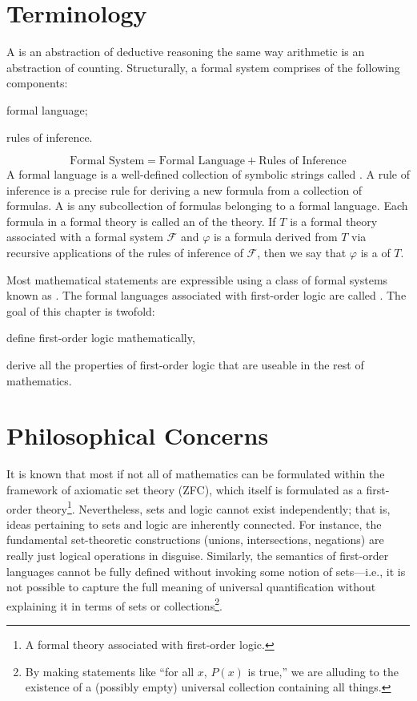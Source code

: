 \section{Terminology}
A  is an abstraction of deductive reasoning the same way arithmetic is an abstraction of counting.
Structurally, a formal system comprises of the following components:
\begin{enumerate*}[label=(\arabic*)]
    \item formal language;
    \item rules of inference.
\end{enumerate*}
\begin{equation*}
    \text{Formal System} = \text{Formal Language} + \text{Rules of Inference}
\end{equation*}
A formal language is a well-defined collection of symbolic strings called .
A rule of inference is a precise rule for deriving a new formula from a collection of formulas.
A  is any subcollection of formulas belonging to a formal language.
Each formula in a formal theory is called an  of the theory.
If \( T \) is a formal theory associated with a formal system \( \mathcal{F} \) and \( \varphi \) is a formula derived from \( T \) via recursive applications of
the rules of inference of \( \mathcal{F} \), then we say that \( \varphi \) is a  of \( T \).

\vspace{0.3cm}
\noindent
Most mathematical statements are expressible using a class of formal systems known as .
The formal languages associated with first-order logic are called .
The goal of this chapter is twofold:
\begin{enumerate*}[label=(\arabic*)]
    \item define first-order logic mathematically,
    \item derive all the properties of first-order logic that are useable in the rest of mathematics.
\end{enumerate*}

\section{Philosophical Concerns}
It is known that most if not all of mathematics can be formulated within the framework of axiomatic set theory (ZFC), which itself is formulated as a
first-order theory\footnote{A formal theory associated with first-order logic.}.
Nevertheless, sets and logic cannot exist independently; that is, ideas pertaining to sets and logic are inherently connected.
For instance, the fundamental set-theoretic constructions (unions, intersections, negations) are really just logical operations in disguise.
Similarly, the semantics of first-order languages cannot be fully defined without invoking some notion of sets---i.e., it is not possible to capture the full meaning of
universal quantification without explaining it in terms of sets or collections\footnote{ By making statements like ``for all \( x \), \( P(x) \) is true,'' we are alluding to the existence of a (possibly empty) universal collection containing all things.}.

